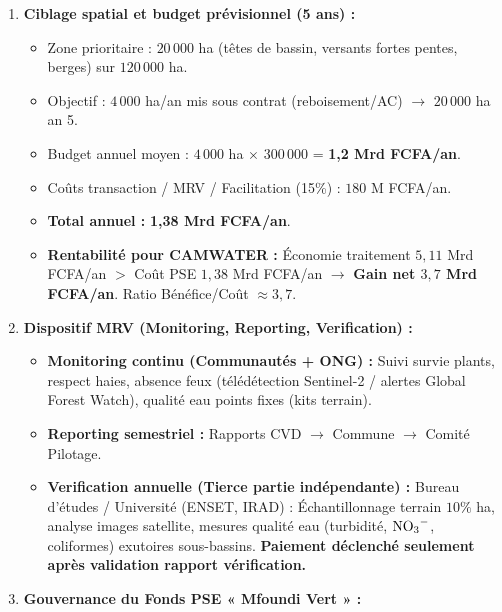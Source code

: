 \documentclass[11pt]{article}
\begin{document}
\begin{exoresolu}
\begin{enumerate}
\begin{itemize}
            \item \textbf{Prix PSE proposé :} \textbf{300\,000 FCFA/ha/an} (versé conditionnellement aux résultats MRV).
        \end{itemize}
        \item \textbf{Ciblage spatial et budget prévisionnel (5 ans) :}
        \begin{itemize}
            \item Zone prioritaire : $20\,000$ ha (têtes de bassin, versants fortes pentes, berges) sur $120\,000$ ha.
            \item Objectif : $4\,000$ ha/an mis sous contrat (reboisement/AC) $\rightarrow$ $20\,000$ ha an 5.
            \item Budget annuel moyen : $4\,000$ ha $\times$ $300\,000$ = \textbf{1,2 Mrd FCFA/an}.
            \item Coûts transaction / MRV / Facilitation (15\%) : $180$ M FCFA/an.
            \item \textbf{Total annuel :} \textbf{1,38 Mrd FCFA/an}.
            \item \textbf{Rentabilité pour CAMWATER :} Économie traitement $5,11$ Mrd FCFA/an $>$ Coût PSE $1,38$ Mrd FCFA/an $\rightarrow$ \textbf{Gain net $3,7$ Mrd FCFA/an}. Ratio Bénéfice/Coût $\approx 3,7$.
        \end{itemize}
        \item \textbf{Dispositif MRV (Monitoring, Reporting, Verification) :}
        \begin{itemize}
            \item \textbf{Monitoring continu (Communautés + ONG) :} Suivi survie plants, respect haies, absence feux (télédétection Sentinel-2 / alertes Global Forest Watch), qualité eau points fixes (kits terrain).
            \item \textbf{Reporting semestriel :} Rapports CVD $\rightarrow$ Commune $\rightarrow$ Comité Pilotage.
            \item \textbf{Verification annuelle (Tierce partie indépendante) :} Bureau d'études / Université (ENSET, IRAD) : Échantillonnage terrain $10\%$ ha, analyse images satellite, mesures qualité eau (turbidité, $\ce{NO3-}$, coliformes) exutoires sous-bassins. \textbf{Paiement déclenché seulement après validation rapport vérification.}
        \end{itemize}
        \item \textbf{Gouvernance du Fonds PSE « Mfoundi Vert » :}
        \begin{itemize}

\end{itemize}
\end{enumerate}
\end{exoresolu}
\end{document}

